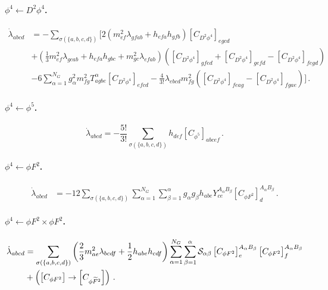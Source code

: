 \paragraph{\texorpdfstring{$\phi^{4} \leftarrow D^2\phi^4$}{phi4fromD2phi4}.}

\begin{align}
    \dot \lambda_{abcd} &= - \sum_{\sigma(\{a,b,c,d\})} \Bigg[2(m^2_{ef}\lambda_{gfab}+h_{efa}h_{gfb})\left[C_{D^2\phi^4}\right]_{egcd}\label{eq:phi4<-D2phi4}\\\nonumber 
    &+\left(\frac{1}{3}m^2_{ef}\lambda_{gcab}+h_{efa}h_{gbc}+m^2_{gc}\lambda_{efab}\right)\left(\left[C_{D^2\phi^4}\right]_{gfed}+\left[C_{D^2\phi^4}\right]_{gefd}-\left[C_{D^2\phi^4}\right]_{fegd}\right)\\
    &-6\sum_{\alpha=1}^{N_G} g_\alpha^2 m^2_{fg} T^\alpha_{agbe} \left[C_{D^2\phi^4}\right]_{efcd}
    -\frac{4}{3!}\lambda_{ebcd}m^2_{fg}\left(
    \left[C_{D^2\phi^4}\right]_{feag}-\left[C_{D^2\phi^4}\right]_{fgae}
    \right)
    \Bigg]\,.
    \nonumber
\end{align}

\paragraph{\texorpdfstring{$\phi^4 \leftarrow \phi^5$}{phi4fromphi5}.}
\begin{equation}
    \dot \lambda_{abcd} = - \frac{5!}{3!}\sum_{\sigma(\{a,b,c,d\})} h_{def}\left[C_{\phi^5}\right]_{abcef}\,.
\end{equation}

\paragraph{\texorpdfstring{$\phi^4 \leftarrow \phi F^2$}{phi4fromphiF2}.}

\begin{align}
    \dot\lambda_{abcd} &=
    -12\sum_{\sigma(\{a,b,c,d\})} \sum_{\alpha=1}^{N_G} \sum_{\beta=1}^{\alpha} g_\alpha g_\beta h_{abe} Y_{ce}^{A_\alpha B_\beta} \left[C_{\phi F^2}\right]_{d}^{A_\alpha B_\beta}\,.
    \label{eq:phi4<-phiF2}
\end{align}

\paragraph{\texorpdfstring{$\phi^4 \leftarrow \phi F^2 \times \phi F^2$}{phi4fromphiF2xphiF2}.}

\begin{align}
    \dot \lambda_{abcd} &= \sum_{\sigma(\{a,b,c,d\})} \left(\frac{2}{3} m^2_{ae}\lambda_{bcdf}+\frac{1}{2}h_{abe} h_{cdf}\right) \sum_{\alpha=1}^{N_G}\sum_{\beta=1}^\alpha \mathcal{S}_{\alpha\beta} \left[C_{\phi F^2}\right]_{e}^{A_\alpha B_\beta} \left[C_{\phi F^2}\right]_{f}^{A_\alpha B_\beta}\nonumber \\
    &+ \left(\left[C_{\phi F^2}\right]\to \left[C_{\phi \widetilde{F}^2}\right]\right)\,.
\end{align}

